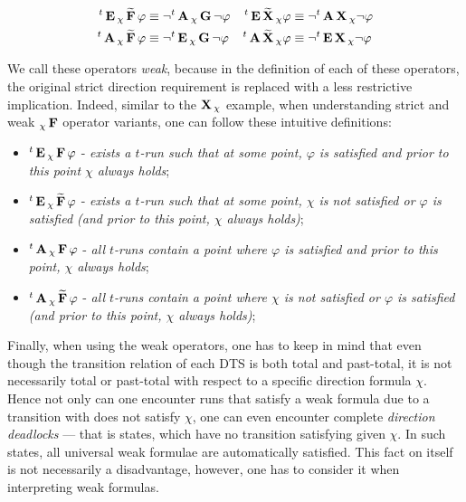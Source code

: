 \begin{align*}
	{}^{t}\operatorname{\mathbf{E}}{}_{\chi}\operatorname{\mathbf{\widetilde{F}}} \varphi & \equiv \neg {}^{t}\operatorname{\mathbf{A}}{}_{\chi}\operatorname{\mathbf{G}} \neg \varphi &
	{}^{t}\operatorname{\mathbf{E}}\operatorname{\mathbf{\widetilde{X}}}{}_{\chi} \varphi & \equiv \neg {}^{t}\operatorname{\mathbf{A}}\operatorname{\mathbf{X}}{}_{\chi} \neg \varphi \\	
	{}^{t}\operatorname{\mathbf{A}}{}_{\chi}\operatorname{\mathbf{\widetilde{F}}} \varphi & \equiv \neg {}^{t}\operatorname{\mathbf{E}}{}_{\chi}\operatorname{\mathbf{G}} \neg \varphi &
	{}^{t}\operatorname{\mathbf{A}}\operatorname{\mathbf{\widetilde{X}}}{}_{\chi} \varphi & \equiv \neg {}^{t}\operatorname{\mathbf{E}}\operatorname{\mathbf{X}}{}_{\chi} \neg \varphi \\
\end{align*}

We call these operators \emph{weak}, because in the definition of each of these operators, the original strict direction requirement is replaced with a less restrictive implication. Indeed, similar to the $\operatorname{\mathbf{X}}{}_{\chi}$ example, when understanding strict and weak ${}_{\chi}\operatorname{\mathbf{F}}$ operator variants, one can follow these intuitive definitions:

\begin{itemize}
	\item ${}^{t}\operatorname{\mathbf{E}}{}_{\chi}\operatorname{\mathbf{F}} \varphi$ - \emph{exists a $t$-run such that at some point, $\varphi$ is satisfied and prior to this point $\chi$ always holds};
	\item ${}^{t}\operatorname{\mathbf{E}}{}_{\chi}\operatorname{\mathbf{\widetilde{F}}} \varphi$ - \emph{exists a $t$-run such that at some point, $\chi$ is not satisfied or $\varphi$ is satisfied (and prior to this point, $\chi$ always holds)};
	\item ${}^{t}\operatorname{\mathbf{A}}{}_{\chi}\operatorname{\mathbf{F}} \varphi$ - \emph{all $t$-runs contain a point where $\varphi$ is satisfied and prior to this point, $\chi$ always holds};
	\item ${}^{t}\operatorname{\mathbf{A}}{}_{\chi}\operatorname{\mathbf{\widetilde{F}}} \varphi$ - \emph{all $t$-runs contain a point where $\chi$ is not satisfied or $\varphi$ is satisfied (and prior to this point, $\chi$ always holds)};
\end{itemize}

Finally, when using the weak operators, one has to keep in mind that even though the transition relation of each \ac{DTS} is both total and past-total, it is not necessarily total or past-total with respect to a specific direction formula $\chi$. Hence not only can one encounter runs that satisfy a weak formula due to a transition with does not satisfy $\chi$, one can even encounter complete \emph{direction deadlocks} — that is states, which have no transition satisfying given $\chi$. In such states, all universal weak formulae are automatically satisfied. This fact on itself is not necessarily a disadvantage, however, one has to consider it when interpreting weak formulas.

